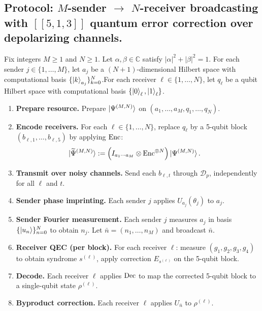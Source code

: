 \subsection{Protocol: $M$-sender $\to$ $N$-receiver broadcasting with $[[5,1,3]]$ quantum error correction over depolarizing channels.}


Fix integers $M\ge 1$ and $N\ge 1$. Let $\alpha,\beta\in\mathbb{C}$ satisfy $|\alpha|^2+|\beta|^2=1$. For each sender $j\in\{1,\dots,M\}$, let $a_j$ be a $(N{+}1)$-dimensional Hilbert space with computational basis $\{\ket{k}_{a_j}\}_{k=0}^N$.For each receiver $\ell\in\{1,\dots,N\}$, let $q_\ell$ be a qubit Hilbert space with computational basis $\{\ket{0}_\ell,\ket{1}_\ell\}$.
    
\begin{enumerate}
    \item \textbf{Prepare resource.} Prepare $\ket{\Psi^{(M,N)}}$ on $(a_1,\dots,a_M,q_1,\dots,q_N)$.
    
    \item \textbf{Encode receivers.} For each $\ell\in\{1,\dots,N\}$, replace $q_\ell$ by a 5-qubit block
    $(b_{\ell,1},\dots,b_{\ell,5})$ by applying $\operatorname{Enc}$:
    \begin{align}
    \ket{\widetilde{\Psi}^{(M,N)}}
    &:= \left(I_{a_1\cdots a_M}\otimes \operatorname{Enc}^{\otimes N}\right)\ket{\Psi^{(M,N)}}.
    \end{align}
    
    \item \textbf{Transmit over noisy channels.} Send each $b_{\ell,t}$ through $\mathcal{D}_p$, independently for all $\ell$ and $t$.
    
    \item \textbf{Sender phase imprinting.} Each sender $j$ applies $U_{a_j}(\theta_j)$ to $a_j$.
    
    \item \textbf{Sender Fourier measurement.} Each sender $j$ measures $a_j$ in basis $\{\ket{u_n}\}_{n=0}^N$ to obtain $n_j$.
    Let $\bar n=(n_1,\dots,n_M)$ and broadcast $\bar n$.
    
    \item \textbf{Receiver QEC (per block).} For each receiver $\ell$:
    measure $(g_1,g_2,g_3,g_4)$ to obtain syndrome $s^{(\ell)}$, apply correction $E_{s^{(\ell)}}$ on the 5-qubit block.
    
    \item \textbf{Decode.} Each receiver $\ell$ applies $\operatorname{Dec}$ to map the corrected 5-qubit block to a single-qubit state $\rho^{(\ell)}$.
    
    \item \textbf{Byproduct correction.} Each receiver $\ell$ applies $U_{\bar n}$ to $\rho^{(\ell)}$.
\end{enumerate}


